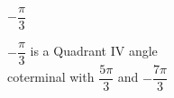 {$-\dfrac{\pi}{3}$}
{$-\dfrac{\pi}{3}$ is a Quadrant IV angle\\
coterminal with $\dfrac{5\pi}{3}$ and $-\dfrac{7\pi}{3}$ 

\begin{center}
\end{center}}